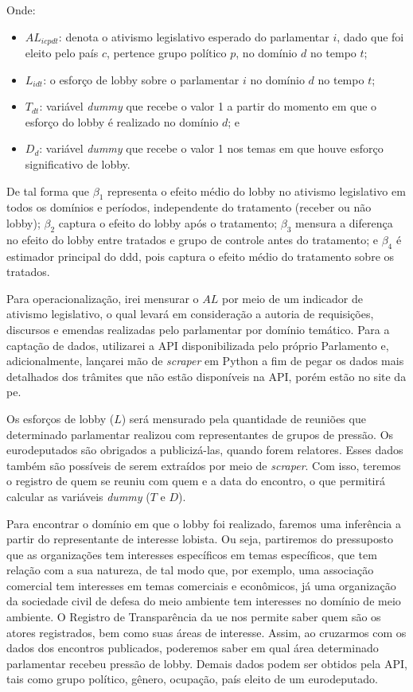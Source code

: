 Onde:
\begin{itemize}
    \item $AL_{icpdt}$: denota o ativismo legislativo esperado do parlamentar $i$, dado que foi eleito pelo país $c$, pertence grupo político $p$, no domínio $d$ no tempo $t$;
    \item $L_{idt}$: o esforço de lobby sobre o parlamentar $i$ no domínio $d$ no tempo $t$;
    \item $T_{dt}$: variável \textit{dummy} que recebe o valor 1 a partir do momento em que o esforço do lobby é realizado no domínio $d$; e
    \item $D_d$: variável \textit{dummy} que recebe o valor 1 nos temas em que houve esforço significativo de lobby.
\end{itemize}

De tal forma que $\beta_1$ representa o efeito médio do lobby no ativismo legislativo em todos os domínios e períodos, independente do tratamento (receber ou não lobby); $\beta_2$ captura o efeito do lobby após o tratamento; $\beta_3$ mensura a diferença no efeito do lobby entre tratados e grupo de controle antes do tratamento; e $\beta_4$ é estimador principal do \acrshort{ddd}, pois captura o efeito médio do tratamento sobre os tratados.

Para operacionalização, irei mensurar o $AL$ por meio de um indicador de ativismo legislativo, o qual levará em consideração a autoria de requisições, discursos e emendas realizadas pelo parlamentar por domínio temático. Para a captação de dados, utilizarei a API disponibilizada pelo próprio Parlamento e, adicionalmente, lançarei mão de \textit{scraper} em Python a fim de pegar os dados mais detalhados dos trâmites que não estão disponíveis na API, porém estão no site da \acrshort{pe}.

Os esforços de lobby ($L$) será mensurado pela quantidade de reuniões que determinado parlamentar realizou com representantes de grupos de pressão. Os eurodeputados são obrigados a publicizá-las, quando forem relatores. Esses dados também são possíveis de serem extraídos por meio de \textit{scraper}. Com isso, teremos o registro de quem se reuniu com quem e a data do encontro, o que permitirá calcular as variáveis \textit{dummy} ($T$ e $D$).

Para encontrar o domínio em que o lobby foi realizado, faremos uma inferência a partir do representante de interesse lobista. Ou seja, partiremos do pressuposto que as organizações tem interesses específicos em temas específicos, que tem relação com a sua natureza, de tal modo que, por exemplo, uma associação comercial tem interesses em temas comerciais e econômicos, já uma organização da sociedade civil de defesa do meio ambiente tem interesses no domínio de meio ambiente. O Registro de Transparência da \acrshort{ue} nos permite saber quem são os atores registrados, bem como suas áreas de interesse. Assim, ao cruzarmos com os dados dos encontros publicados, poderemos saber em qual área determinado parlamentar recebeu pressão de lobby. Demais dados podem ser obtidos pela API, tais como grupo político, gênero, ocupação, país eleito de um eurodeputado. 





